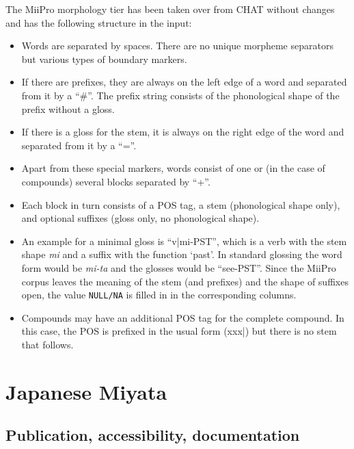 \documentclass[a4paper, 11pt]{book}
\begin{document}
The MiiPro morphology tier has been taken over from CHAT without changes and has the following structure in the input:

\begin{itemize}
	\item Words are separated by spaces. There are no unique morpheme separators but various types of boundary markers. 
	\item If there are prefixes, they are always on the left edge of a word and separated from it by a “\#”. The prefix string consists of the phonological shape
		of the prefix without a gloss. 
	\item If there is a gloss for the stem, it is always on the right edge of the word and separated from it by a “=”.
	\item Apart from these special markers, words consist of one or (in the case of compounds) several blocks separated by “+”. 
	\item Each block in turn consists of a POS tag, a stem (phonological shape only), and optional suffixes (gloss only, no phonological shape). 
	\item An example for a minimal gloss is “v|mi-PST”, which is a verb with the stem shape \emph{mi} and a suffix with 
		the function ‘past’. In standard glossing the word form would be \emph{mi-ta} and the glosses would be “see-PST”. 
		Since the MiiPro corpus leaves the meaning of the stem (and prefixes) and the shape of suffixes open, the value \texttt{NULL/NA} is filled 
		in in the corresponding columns. 
	\item Compounds may have an additional POS tag for the complete compound. In this case, the POS is prefixed in the usual form (xxx|) but there is no stem that follows.
\end{itemize}


\section{Japanese Miyata}
\label{sec:Japanese Miyata}

\subsection{Publication, accessibility, documentation}
\end{document}
